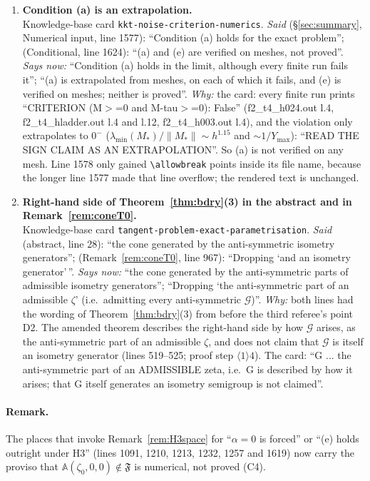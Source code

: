 \documentclass[11pt]{article}
\newcommand{\Aop}{\mathbb A}
\begin{document}
\begin{enumerate}[label=C\arabic*,ref=C\arabic*,leftmargin=2.4em,itemsep=3pt]
 $+\infty$ is a convention, and reading it as a margin ``is legitimate only after (a) \dots\
 has been granted'' (lines 1033--1037), while (a) fails at every finite mesh.  The card says
 the corner row ``represents the continuum $E(\zeta_0)$'', ``diverges'', and that
 $E(\zeta_0)=+\infty$ is ``a convention, not a margin''.
\item\label{corr0924:C9} \textbf{Condition (a) is an extrapolation.}\\
 Knowledge-base card \texttt{kkt-noise-criterion-numerics}.
 \emph{Said} (\S\ref{sec:summary}, Numerical input, line 1577): ``Condition (a) holds for the
 exact problem''; (Conditional, line 1624): ``(a) and (e) are verified on meshes, not
 proved''.
 \emph{Says now:} ``Condition (a) holds in the limit, although every finite run fails it'';
 ``(a) is extrapolated from meshes, on each of which it fails, and (e) is verified on meshes;
 neither is proved''.
 \emph{Why:} the card: every finite run prints ``CRITERION (M$>$=0 and M-tau$>$=0): False''
 (f2\_t4\_h024.out l.4, f2\_t4\_hladder.out l.4 and l.12, f2\_t4\_h003.out l.4), and the
 violation only extrapolates to $0^-$ ($\lambda_{\min}(M_*)/\|M_*\|\sim h^{1.15}$ and
 $\sim1/Y_{\max}$): ``READ THE SIGN CLAIM AS AN EXTRAPOLATION''.  So (a) is not verified on
 any mesh. Line 1578 only gained \texttt{\textbackslash allowbreak} points inside its file name, because the longer line 1577 made that line overflow; the rendered text is unchanged.
\item\label{corr0924:C10} \textbf{Right-hand side of Theorem~\ref{thm:bdry}(3) in the
 abstract and in Remark~\ref{rem:coneT0}.}\\
 Knowledge-base card \texttt{tangent-problem-exact-parametrisation}.
 \emph{Said} (abstract, line 28): ``the cone generated by the anti-symmetric isometry
 generators''; (Remark~\ref{rem:coneT0}, line 967): ``Dropping `and an isometry
 generator'\,''.
 \emph{Says now:} ``the cone generated by the anti-symmetric parts of admissible isometry
 generators''; ``Dropping `the anti-symmetric part of an admissible $\zeta$' (i.e.\ admitting
 every anti-symmetric $\mathcal G$)''.
 \emph{Why:} both lines had the wording of Theorem~\ref{thm:bdry}(3) from before the third
 referee's point D2.  The amended theorem describes the right-hand side by how $\mathcal G$
 arises, as the anti-symmetric part of an admissible $\zeta$, and does not claim that
 $\mathcal G$ is itself an isometry generator (lines 519--525; proof step $\langle1\rangle4$).
 The card: ``G ... the anti-symmetric part of an ADMISSIBLE zeta, i.e.\ G is described by how
 it arises; that G itself generates an isometry semigroup is not claimed''.
\end{enumerate}
%
\paragraph{Remark.}  The places that invoke Remark~\ref{rem:H3space} for ``$\alpha=0$ is
forced'' or ``(e) holds outright under H3'' (lines 1091, 1210, 1213, 1232, 1257 and 1619) now
carry the proviso that $\Aop(\zeta_0,0,0)\notin\mathfrak F$ is numerical, not proved (C4).
\end{document}
